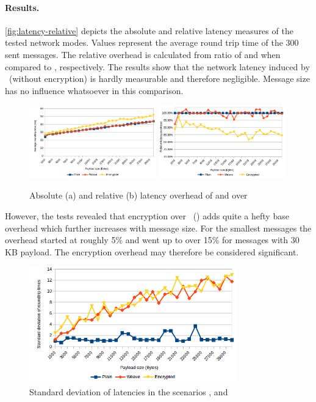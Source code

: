 \paragraph{Results.} 
\autoref{fig:latency-relative} depicts the absolute and relative latency measures of the tested network modes. Values represent the average round trip time of the 300 sent messages. The relative overhead is calculated from ratio of  and  when compared to , respectively. The results show that the network latency induced by \wnet\ (without encryption) is hardly measurable and therefore negligible. Message size has no influence whatsoever in this comparison. 


\begin{figure}[htpb]
  \centering
  \includegraphics[width=0.49\textwidth]{figures/latency-absolute}
  \includegraphics[width=0.49\textwidth]{figures/latency-relative}
  \caption[Latency overhead]{Absolute (a) and relative (b) latency overhead of  and  over }\label{fig:latency-relative}
\end{figure}

However, the tests revealed that encryption over \wnet\ () adds quite a hefty base overhead which further increases with message size. For the smallest messages the overhead started at roughly 5\% and went up to over 15\% for messages with 30 KB payload. The encryption overhead may therefore be considered significant.

\begin{figure}[htpb]
  \centering
  \includegraphics[width=0.8\textwidth]{figures/latency-stdev}
  \caption[Latency deviation]{Standard deviation of latencies in the scenarios ,  and }\label{fig:latency-stdev}
\end{figure}

